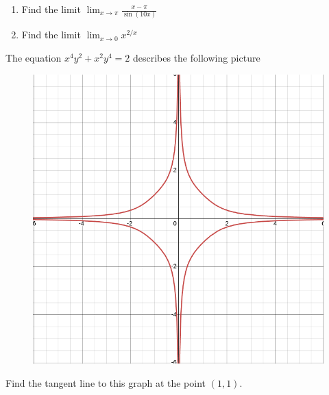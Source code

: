 \documentclass[12pt]{amsart}
\begin{document}
\newpage

\begin{problem}[20 points]
\begin{enumerate}
	\item Find the limit $\displaystyle \lim_{x\to \pi} \frac{x - \pi}{\sin (10x)}$
	      \vspace{10cm}
	\item Find the limit $\displaystyle \lim_{x\to 0} x^{2/x}$
	      \vspace{10cm}
\end{enumerate}
\end{problem}

\newpage

\begin{problem}[20 points]
The equation $x^4 y^2 + x^2 y^4 = 2$ describes the following picture
\begin{figure}[ht!]
	\begin{center}
		\includegraphics[width = 0.6\linewidth]{fig1.png}
	\end{center}
\end{figure}
\end{problem}
Find the tangent line to this graph at the point $(1,1)$.
\end{document}
